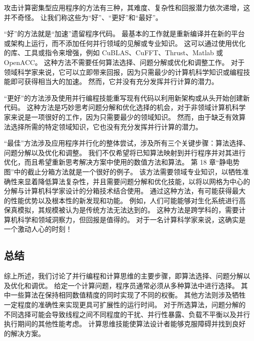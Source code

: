 攻击计算密集型应用程序的方法有三种，其难度、复杂性和回报潜力依次递增，这并不奇怪。 让我们称这些为“好”、“更好”和“最好”。

“好”的方法就是“加速”遗留程序代码。 最基本的工作就是重新编译并在新的平台或架构上运行，而不添加任何并行领域的见解或专业知识。 这可以通过使用优化的库、工具或指令来增强，例如 CuBLAS、CuFFT、Thrust、Matlab 或 OpenACC。 这种方法不需要任何算法选择、问题分解或优化和调整工作。 对于领域科学家来说，它可以立即带来回报，因为只需最少的计算机科学知识或编程技能即可获得相当大的加速。 然而，它并没有充分发挥并行计算的潜力。

“更好”的方法涉及使用并行编程技能重写现有代码以利用新架构或从头开始创建新代码。 这种方法是巧妙思考问题分解和优化选择的机会，对于非领域计算机科学家来说是一项很好的工作，因为只需要最少的领域知识。 然而，由于缺乏有效算法选择所需的特定领域知识，它也没有充分发挥并行计算的潜力。

“最佳”方法涉及应用程序并行化的整体尝试，涉及所有三个关键步骤：算法选择、问题分解以及优化和调整。 我们不仅希望将已知算法映射到并行程序并对其进行优化，而且希望重新思考解决方案中使用的数值方法和算法。 第 18 章“静电势图”中的截止分箱方法就是一个很好的例子。 该方法需要领域专业知识，以牺牲准确性来显着降低算法复杂性，并且需要问题分解和优化技能，以将以网格为中心的分解与计算机科学家设计的分箱技术结合使用。 通过这种方法，有可能获得最大的性能优势以及根本性的新发现和功能。 例如，人们可能能够对生化系统进行高保真模拟，其规模被认为是传统方法无法达到的。 这种方法是跨学科的，需要计算机科学和领域洞察力，但回报是值得的。 对于一名计算科学家来说，这确实是一个激动人心的时刻！

\subsection{总结}
综上所述，我们讨论了并行编程和计算思维的主要步骤，即算法选择、问题分解以及优化和调优。 给定一个计算问题，程序员通常必须从多种算法中进行选择。 其中一些算法在保持相同数值精度的同时实现了不同的权衡。 其他方法则涉及牺牲一定程度的准确性来实现更具可扩展性的运行时间。 对于所选算法，问题分解的不同选择可能会导致线程之间不同程度的干扰、并行性暴露、负载不平衡以及并行执行期间的其他性能考虑。 计算思维技能使算法设计者能够克服障碍并找到良好的解决方案。






